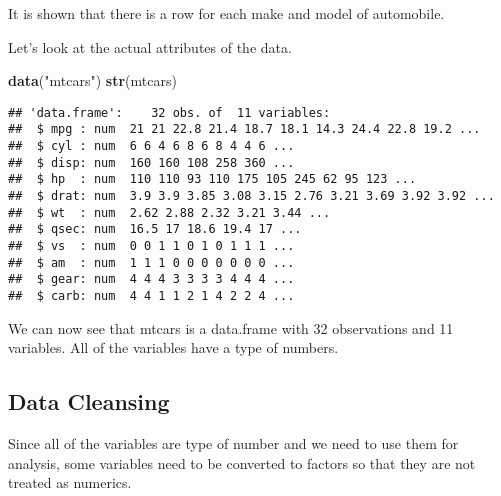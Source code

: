 \documentclass[]{article}
\newenvironment{Shaded}{\begin{snugshade}}{\end{snugshade}}
\newcommand{\KeywordTok}[1]{\textcolor[rgb]{0.13,0.29,0.53}{\textbf{#1}}}
\newcommand{\StringTok}[1]{\textcolor[rgb]{0.31,0.60,0.02}{#1}}
\newcommand{\OperatorTok}[1]{\textcolor[rgb]{0.81,0.36,0.00}{\textbf{#1}}}
\newcommand{\NormalTok}[1]{#1}
\begin{document}
It is shown that there is a row for each make and model of automobile.

Let's look at the actual attributes of the data.

\begin{Shaded}
\begin{Highlighting}[]
\KeywordTok{data}\NormalTok{(}\StringTok{"mtcars"}\NormalTok{)}
\KeywordTok{str}\NormalTok{(mtcars)}
\end{Highlighting}
\end{Shaded}

\begin{verbatim}
## 'data.frame':    32 obs. of  11 variables:
##  $ mpg : num  21 21 22.8 21.4 18.7 18.1 14.3 24.4 22.8 19.2 ...
##  $ cyl : num  6 6 4 6 8 6 8 4 4 6 ...
##  $ disp: num  160 160 108 258 360 ...
##  $ hp  : num  110 110 93 110 175 105 245 62 95 123 ...
##  $ drat: num  3.9 3.9 3.85 3.08 3.15 2.76 3.21 3.69 3.92 3.92 ...
##  $ wt  : num  2.62 2.88 2.32 3.21 3.44 ...
##  $ qsec: num  16.5 17 18.6 19.4 17 ...
##  $ vs  : num  0 0 1 1 0 1 0 1 1 1 ...
##  $ am  : num  1 1 1 0 0 0 0 0 0 0 ...
##  $ gear: num  4 4 4 3 3 3 3 4 4 4 ...
##  $ carb: num  4 4 1 1 2 1 4 2 2 4 ...
\end{verbatim}

We can now see that mtcars is a data.frame with 32 observations and 11
variables. All of the variables have a type of numbers.

\subsection{Data Cleansing}\label{data-cleansing}

Since all of the variables are type of number and we need to use them
for analysis, some variables need to be converted to factors so that
they are not treated as numerics.

\begin{Shaded}
\end{Shaded}
\end{document}
